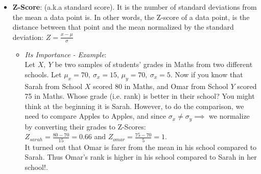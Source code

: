 \documentclass[11pt, twocolumn]{article}
\begin{document}
\begin{itemize}
\item \textbf{Z-Score}: (a.k.a  standard score). It is the number of standard deviations from the mean a data point is. In other words, the Z-score of a data point, is the distance between that point and the mean {\color{blue}normalized} by the standard deviation: $Z = \frac{x - \mu}{\sigma} $
\begin{itemize}
\item \textit{Its Importance - Example}:\\
Let $X, ~Y$ be two samples of students' grades in Maths from two different schools. Let $\mu_x = 70,~ \sigma_x = 15$, $\mu_y = 70,~ \sigma_x = 5$. Now if you know that Sarah from School $X$  scored 80 in Maths, and Omar from School $Y$ scored 75 in Maths. Whose grade (i.e. rank) is better in their school? You might think at the beginning it is Sarah. However, to do the comparison, we need to compare Apples to Apples, and since $\sigma_x \neq \sigma_y \implies$  we normalize by converting their grades to Z-Scores:\\
$Z_{sarah} = \frac{80 - 70}{15} = 0.66$ and $Z_{omar} = \frac{75 - 70}{5} = 1$. \\It turned out that Omar is farer from the mean in his school compared to Sarah. Thus Omar's rank is higher in {\color{blue} his} school compared to Sarah in {\color{blue} her} school!.
\end{itemize}
\end{itemize}
\end{document}
